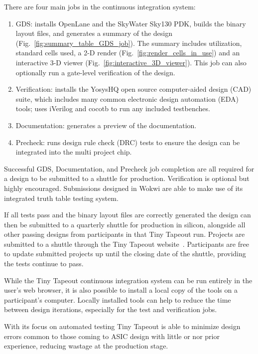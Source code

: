 There are four main jobs in the continuous integration system:

\begin{enumerate}
	\item GDS: installs OpenLane\cite{openlane} and the SkyWater Sky130\cite{skywaterpdk} PDK, builds the binary layout files, and generates a summary of the design (Fig.~\ref{fig:summary_table_GDS_job}). The summary includes utilization, standard cells used, a 2-D render (Fig.~\ref{fig:render_cells_in_use}) and an interactive 3-D viewer (Fig.~\ref{fig:interactive_3D_viewer}).
This job can also optionally run a gate-level verification of the design.
	\item Verification: installs the YosysHQ open source computer-aided design (CAD) suite, which includes many common electronic design automation (EDA) tools; uses iVerilog\cite{iverilog} and cocotb\cite{cocotb} to run any included testbenches.
	\item Documentation: generates a preview of the documentation.
	\item Precheck: runs design rule check (DRC) tests to ensure the design can be integrated into the multi project chip.
\end{enumerate}

Successful GDS, Documentation, and Precheck job completion are all required for a design to be submitted to a shuttle for production.
Verification is optional but highly encouraged. Submissions designed in Wokwi are able to make use of its integrated truth table testing system\cite{automatedtesting}.

If all tests pass and the binary layout files are correctly generated the design can then be submitted to a quarterly shuttle for production in silicon, alongside all other passing designs from participants in that Tiny Tapeout run. Projects are submitted to a shuttle through the Tiny Tapeout website~\cite{tinytapeout}. Participants are free to update submitted projects up until the closing date of the shuttle, providing the tests continue to pass.

While the Tiny Tapeout continuous integration system can be run entirely in the user's web browser, it is also possible to install a local copy of the tools\cite{localinstall} on a participant's computer. Locally installed tools can help to reduce the time between design iterations, especially for the test and verification jobs.

With its focus on automated testing Tiny Tapeout is able to minimize design errors common to those coming to ASIC design with little or nor prior experience, reducing wastage at the production stage.

